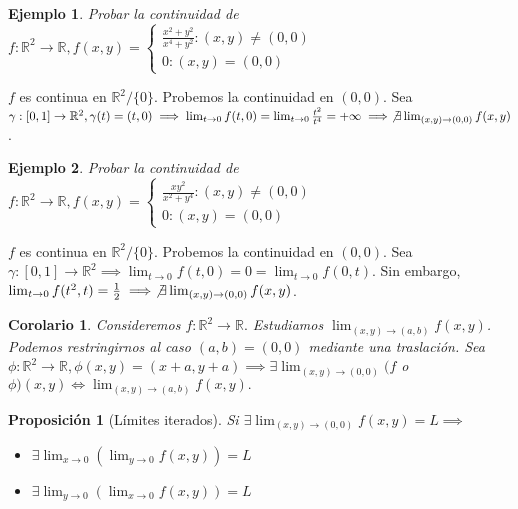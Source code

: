\documentclass[11pt, a4paper]{article}
\makeatletter
\newif\IfInSansMode
\let\oldsf\sffamily
\renewcommand*{\sffamily}{\oldsf\mathversion{sans}\InSansModetrue}
\let\oldnorm\normalfont
\renewcommand*{\normalfont}{\oldnorm\InSansModefalse\mathversion{normal}}
\newcommand{\R}{\mathbb{R}} \newcommand{\N}{\mathbb{N}}
\renewenvironment{proof}[1][\proofname] {\par\pushQED{\qed}\normalfont\topsep6\p@\@plus6\p@\relax\trivlist\item[\hskip\labelsep\itshape\sffamily#1\@addpunct{.}]\ignorespaces}{\popQED\endtrivlist\@endpefalse}
\theoremstyle{theorem-style}
\newtheorem{nprop}{Proposición}[section]
\newtheorem{ncor}{Corolario}[section]
\theoremstyle{definition-style}
\theoremstyle{remark-style}
\theoremstyle{example-style}
\newtheorem{ejemplo}{Ejemplo}[section]
\makeatother
\begin{document}
\begin{ejemplo}
	Probar la continuidad de $ f: \R^2 \to \R, f(x,y) = \left\lbrace
	\begin{array}{ll}
	\frac{x^2+y^2}{x^4+y^2} : (x,y) \ne (0,0)\\
	0: (x,y) = (0,0)
	\end{array}
	\right.$
\end{ejemplo}

\begin{proof}
	$f$ es continua en $\R^2/\{0\}$. Probemos la continuidad en $(0,0)$. Sea $\gamma:[0,1] \to \R^2, \gamma(t) = (t,0) \implies \lim_{t \to 0} f(t,0) = \lim_{t \to 0}\frac{t^2}{t^4}= +\infty \implies \not\exists \lim_{(x,y) \to (0,0)} f(x,y)$.
\end{proof}

\begin{ejemplo}
	Probar la continuidad de $ f: \R^2 \to \R, f(x,y) = \left\lbrace
	\begin{array}{ll}
	\frac{xy^2}{x^2+y^4} : (x,y) \ne (0,0)\\
	0: (x,y) = (0,0)
	\end{array}
	\right.$
\end{ejemplo}

\begin{proof}
	$f$ es continua en $\R^2/\{0\}$. Probemos la continuidad en $(0,0)$. Sea $\gamma:[0,1] \to \R^2 \implies \lim_{t \to 0} f(t,0) = 0 = \lim_{t \to 0} f(0,t)$. Sin embargo, $\lim_{t \to 0} f(t^2,t)= \frac{1}{2} \implies \not\exists \lim_{(x,y) \to (0,0)} f(x,y)$.
\end{proof}

\begin{ncor}
Consideremos $f:\R^2 \to \R.$ Estudiamos $\lim_{(x,y) \to (a,b)}f(x,y)$. Podemos restringirnos al caso $(a,b)=(0,0)$ mediante una traslación. Sea $\phi:\R^2 \to \R, \phi(x,y) = (x+a,y+a) \implies \exists \lim_{(x,y) \to (0,0)}(f$ o $\phi)(x,y) \Leftrightarrow \lim_{(x,y) \to (a,b)}f(x,y).$
\end{ncor}

\begin{nprop}[Límites iterados]
Si $ \exists \lim_{(x,y) \to (0,0)}f(x,y) = L \implies$ \begin{itemize}
\item $\exists \displaystyle{\lim_{x \to 0}(\lim_{y \to 0}f(x,y))=L}$
\item $\exists \displaystyle{\lim_{y \to 0}(\lim_{x \to 0}f(x,y))=L}$
\end{itemize}
\end{nprop}
\end{document}
